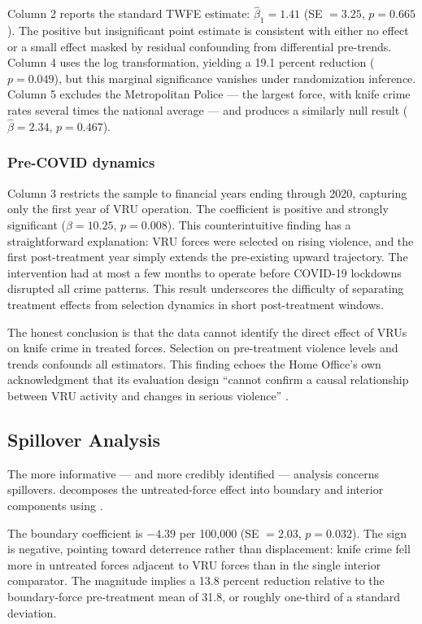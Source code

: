 \documentclass[12pt]{article}
\begin{document}


Column 2 reports the standard TWFE estimate: $\hat\beta_1 = 1.41$ (SE $= 3.25$, $p = 0.665$). The positive but insignificant point estimate is consistent with either no effect or a small effect masked by residual confounding from differential pre-trends. Column 4 uses the log transformation, yielding a 19.1 percent reduction ($p = 0.049$), but this marginal significance vanishes under randomization inference. Column 5 excludes the Metropolitan Police --- the largest force, with knife crime rates several times the national average --- and produces a similarly null result ($\hat\beta = 2.34$, $p = 0.467$).

\subsubsection*{Pre-COVID dynamics} Column 3 restricts the sample to financial years ending through 2020, capturing only the first year of VRU operation. The coefficient is positive and strongly significant ($\hat\beta = 10.25$, $p = 0.008$). This counterintuitive finding has a straightforward explanation: VRU forces were selected on rising violence, and the first post-treatment year simply extends the pre-existing upward trajectory. The intervention had at most a few months to operate before COVID-19 lockdowns disrupted all crime patterns. This result underscores the difficulty of separating treatment effects from selection dynamics in short post-treatment windows.

The honest conclusion is that the data cannot identify the direct effect of VRUs on knife crime in treated forces. Selection on pre-treatment violence levels and trends confounds all estimators. This finding echoes the Home Office's own acknowledgment that its evaluation design ``cannot confirm a causal relationship between VRU activity and changes in serious violence'' \citep{homeoffice2022vru}.

\subsection{Spillover Analysis}

The more informative --- and more credibly identified --- analysis concerns spillovers.  decomposes the untreated-force effect into boundary and interior components using .



The boundary coefficient is $-4.39$ per 100,000 (SE $= 2.03$, $p = 0.032$). The sign is negative, pointing toward deterrence rather than displacement: knife crime fell more in untreated forces adjacent to VRU forces than in the single interior comparator. The magnitude implies a 13.8 percent reduction relative to the boundary-force pre-treatment mean of 31.8, or roughly one-third of a standard deviation.
\end{document}
